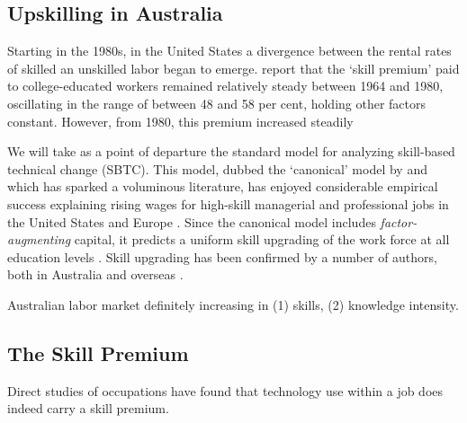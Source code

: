 \subsection{Upskilling in Australia}

Starting in the 1980s, in the United States a divergence between the rental rates of skilled an unskilled labor began to emerge. \citet{Acemoglu2011} report that the `skill premium' paid to college-educated workers remained relatively steady between 1964 and 1980, oscillating in the range of between 48 and 58 per cent, holding other factors constant. However, from 1980, this premium increased steadily 

We will take as a point of departure the standard model for analyzing skill-based technical change (SBTC). This model, dubbed the `canonical' model by \citet{Acemoglu2011} and which has sparked a voluminous literature, has enjoyed considerable empirical success explaining rising wages for high-skill managerial and professional jobs in the United States and Europe \citep{Katz1992}. Since the canonical model includes \emph{factor-augmenting} capital, it predicts a uniform skill upgrading of the work force at all education levels \citep{Levy2003}. Skill upgrading has been confirmed by a number of authors, both in Australia \citep{Esposto2012, Wooden2000, Cully1999} and overseas \citep{Autor2008}. 

Australian labor market definitely increasing in (1) skills, (2) knowledge intensity. \citet{Esposto2012} \citet{Esposto2011}

\cite{Cully1999} %

\cite{Barnes2002} %

\cite{Wooden2000} %

\cite{Card2001} %

\cite{Borland1999}
\cite{Borland2000}

\subsection{The Skill Premium}

Direct studies of occupations have found that technology use within a job does indeed carry a skill premium. \citet{Borland2004} 

\cite{Autor1998} %

